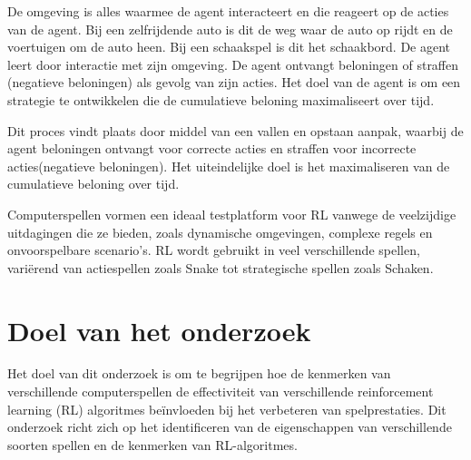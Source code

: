 \documentclass[a4paper,11pt]{report}-
\begin{document}
\noindent
\begin{minipage}[t]{0.65\textwidth}
    \vspace{-6.5\baselineskip}
    De omgeving is alles waarmee de agent interacteert en die reageert op de acties van
    de agent. Bij een zelfrijdende auto is dit de weg waar de auto op rijdt en de
    voertuigen om de auto heen. Bij een schaakspel is dit het schaakbord. De agent
    leert door interactie met zijn omgeving. De agent ontvangt beloningen of
    straffen (negatieve beloningen) als gevolg van zijn acties. Het doel van de
    agent is om een strategie te ontwikkelen die de cumulatieve beloning
    maximaliseert over tijd.
\end{minipage}
\hfill %
\begin{minipage}[t]{0.3\textwidth} %
    \centering
    \label{fig:rl_model}
\end{minipage}

Dit proces vindt plaats door middel van een vallen en opstaan aanpak, waarbij
de agent beloningen ontvangt voor correcte acties en straffen voor incorrecte
acties(negatieve beloningen). Het uiteindelijke doel is het maximaliseren van
de cumulatieve beloning over tijd.

Computerspellen vormen een ideaal testplatform voor RL vanwege de veelzijdige
uitdagingen die ze bieden, zoals dynamische omgevingen, complexe regels en
onvoorspelbare scenario’s. RL wordt gebruikt in veel verschillende spellen,
variërend van actiespellen zoals Snake tot strategische spellen zoals Schaken.

\section{Doel van het onderzoek}
Het doel van dit onderzoek is om te begrijpen hoe de kenmerken van
verschillende computerspellen de effectiviteit van verschillende reinforcement
learning (RL) algoritmes beïnvloeden bij het verbeteren van spelprestaties. Dit
onderzoek richt zich op het identificeren van de eigenschappen van
verschillende soorten spellen en de kenmerken van RL-algoritmes.
\end{document}
